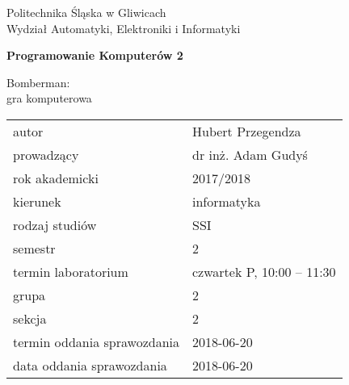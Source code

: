 \documentclass[12pt,a4paper]{article}
\begin{document}
\cleardoublepage


\frenchspacing
\clearpage

\thispagestyle{empty}
\begin{center}
{\Large\sf Politechnika Śląska w Gliwicach \\  %
Wydział Automatyki, Elektroniki i Informatyki

}

\vfill


\vfill\vfill

{\Huge\sffamily\bfseries Programowanie Komputerów 2} \\ %

\vfill\vfill

{\LARGE\sf  Bomberman: \\gra komputerowa}  %


\vfill \vfill\vfill\vfill



\begin{tabular}{ll}
	\toprule
	autor                       & Hubert Przegendza            \\
	prowadzący                  & dr inż. Adam Gudyś\\
	rok akademicki              & 2017/2018  \\
	kierunek                    & informatyka                  \\
	rodzaj studiów              & SSI                          \\
	semestr                     & 2                            \\
	termin laboratorium         & czwartek P, 10:00 -- 11:30 \\
	grupa                       & 2                            \\
	sekcja                      & 2                            \\
	termin oddania sprawozdania & 2018-06-20      \\
	data oddania sprawozdania   & 2018-06-20              \\
	\bottomrule 
\end{tabular}

\end{center}
\cleardoublepage
\end{document}
